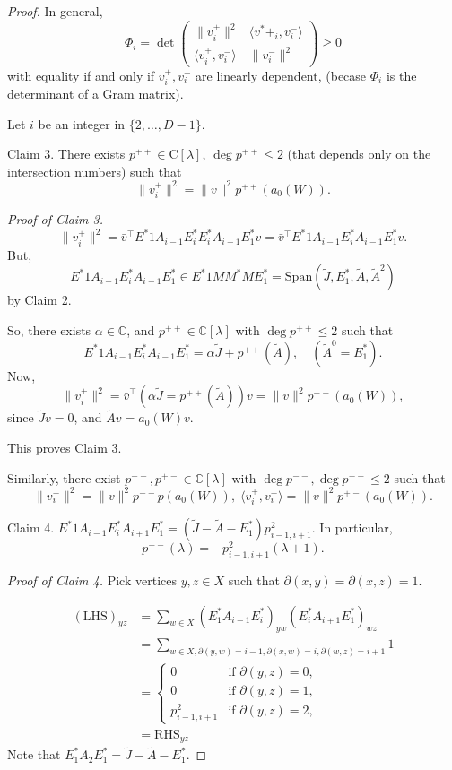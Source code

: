 \documentclass[
]{book}
\theoremstyle{definition}
\theoremstyle{definition}
\theoremstyle{definition}
\theoremstyle{definition}
\theoremstyle{remark}
\begin{document}
\begin{proof}
In general,
\[\Phi_i = \det \begin{pmatrix}\|v^+_i\|^2 & \langle v^*+_i, v^-_i\rangle\\
\langle v^+_i,v^-_i\rangle & \|v^-_i\|^2 \end{pmatrix} \geq 0\]
with equality if and only if \(v^+_i, v^-_i\) are linearly dependent,
(becase \(\Phi_i\) is the determinant of a Gram matrix).

Let \(i\) be an integer in \(\{2, \ldots, D-1\}\).

Claim 3. There exists \(p^{++}\in \mathrm{C}[\lambda]\), \(\deg p^{++}\leq 2\) (that depends only on the intersection numbers)
such that
\[\|v^+_i\|^2 = \|v\|^2 p^{++}(a_0(W)).\]

\emph{Proof of Claim 3.}
\[\|v^+_i\|^2  = \bar{v}^\top E^*1A_{i-1}E^*_iE^*_iA_{i-1}E^*_1v = \bar{v}^\top E^*1A_{i-1}E^*_iA_{i-1}E^*_1v.\]
But,
\[E^*1A_{i-1}E^*_iA_{i-1}E^*_1 \in E^*1MM^*ME^*_1 = \mathrm{Span}(\tilde{J}, E^*_1, \tilde{A}, \tilde{A}^2)\]
by Claim 2.

So, there exists \(\alpha \in \mathbb{C}\), and \(p^{++}\in \mathbb{C}[\lambda]\) with \(\deg p^{++}\leq 2\) such that
\[E^*1A_{i-1}E^*_iA_{i-1}E^*_1 = \alpha \tilde{J} + p^{++}(\tilde{A}), \quad (\tilde{A}^0 = E^*_1).\]
Now,
\[\|v^+_i\|^2 = \bar{v}^\top (\alpha \tilde{J} = p^{++}(\tilde{A}))v = \|v\|^2 p^{++}(a_0(W)),\]
since \(\tilde{J}v = 0\), and \(\tilde{A}v = a_0(W)v\).

This proves Claim 3.

Similarly, there exist \(p^{--}, p^{+-}\in \mathbb{C}[\lambda]\) with \(\deg p^{--}, \deg p^{+-}\leq 2\) such that
\[\|v^-_i\|^2 = \|v\|^2p^{--}p(a_0(W)), \; \langle v^+_i, v^-_i\rangle = \|v\|^2 p^{+-}(a_0(W)).\]

Claim 4. \(E^*1A_{i-1}E^*_iA_{i+1}E^*_1 = (\tilde{J}-\tilde{A}-E^*_1)p^2_{i-1,i+1}\). In particular,
\[p^{+-}(\lambda) = -p^2_{i-1,i+1}(\lambda +1).\]

\emph{Proof of Claim 4.}
Pick vertices \(y,z\in X\) such that \(\partial(x,y) = \partial(x,z) = 1\).

\begin{align}
(\mathrm{LHS})_{yz} & = \sum_{w\in X}(E^*_1A_{i-1}E^*_i)_{yw}(E^*_iA_{i+1}E^*_1)_{wz}\\
& = \sum_{w\in X, \partial(y,w)=i-1,\partial(x,w)=i, \partial(w,z)=i+1}1\\
& = \begin{cases}
0 & \text{if } \partial(y,z) =0,\\
0 & \text{if } \partial(y,z) = 1, \\
p^2_{i-1,i+1} & \text{if }\partial(y,z)=2,
\end{cases}\\
& = \mathrm{RHS}_{yz}
\end{align}
Note that \(E^*_1A_2E^*_1 = \tilde{J}- \tilde{A} - E^*_1\).


\end{proof}
\end{document}
